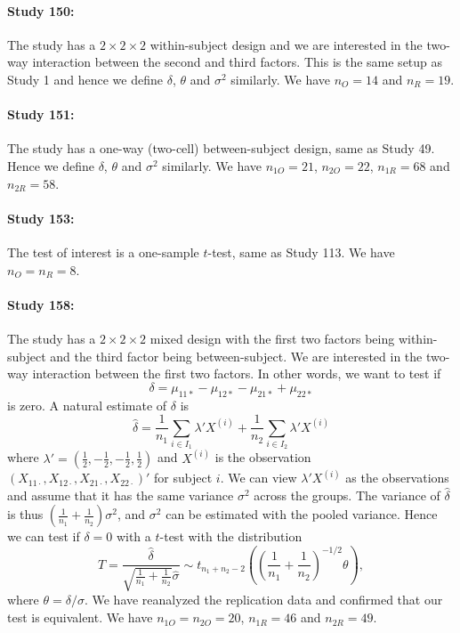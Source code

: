 \documentclass[11pt]{article}
\theoremstyle{definition}
\theoremstyle{custom}
\newcommand{\hdelta}{\hat{\delta}}
\newcommand{\hsigma}{\hat{\sigma}}
\begin{document}
  \paragraph{Study 150: \citet{Forti:2008bq}}
  The study has a $2 \times 2 \times 2$ within-subject design and we are interested in the two-way interaction between the second and third factors. This is the same setup as Study 1 and hence we define $\delta$, $\theta$ and $\sigma^2$ similarly. We have $n_O = 14$ and $n_R = 19$.

  \paragraph{Study 151: \citet{Schnall:2008jz}}
  The study has a one-way (two-cell) between-subject design, same as Study 49. Hence we define $\delta$, $\theta$ and $\sigma^2$ similarly. We have $n_{1O} = 21$, $n_{2O} = 22$, $n_{1R} = 68$ and $n_{2R} = 58$.

  \paragraph{Study 153: \citet{Palmer:2008gb}}
  The test of interest is a one-sample $t$-test, same as Study 113. We have $n_O = n_R = 8$.

  \paragraph{Study 158: \citet{Goschke:2008ey}}
  The study has a $2 \times 2 \times 2$ mixed design with the first two factors being within-subject and the third factor being between-subject. We are interested in the two-way interaction between the first two factors. In other words, we want to test if
  \[
  \delta = \mu_{11*} - \mu_{12*} - \mu_{21*} + \mu_{22*}
  \]
  is zero. A natural estimate of $\delta$ is
  \[
  \hdelta = \frac{1}{n_1} \sum_{i \in I_1} \lambda' X^{(i)} + \frac{1}{n_2} \sum_{i \in I_2} \lambda' X^{(i)}
  \]
  where $\lambda' = (\frac{1}{2}, -\frac{1}{2}, -\frac{1}{2}, \frac{1}{2})$ and $X^{(i)}$ is the observation $(X_{11\cdot}, X_{12\cdot}, X_{21\cdot}, X_{22\cdot})'$ for subject $i$. We can view $\lambda' X^{(i)}$ as the observations and assume that it has the same variance $\sigma^2$ across the groups. The variance of $\hdelta$ is thus $(\frac{1}{n_1} + \frac{1}{n_2}) \sigma^2$, and $\sigma^2$ can be estimated with the pooled variance. Hence we can test if $\delta = 0$ with a $t$-test with the distribution
  \[
  T = \frac{\hdelta}{\sqrt{\frac{1}{n_1} + \frac{1}{n_2}} \hsigma} \sim t_{n_1 + n_2 - 2} \left(\left(\frac{1}{n_1} + \frac{1}{n_2}\right)^{-1/2} \theta\right),
  \]
  where $\theta = \delta / \sigma$. We have reanalyzed the replication data and confirmed that our test is equivalent. We have $n_{1O} = n_{2O} = 20$, $n_{1R} = 46$ and $n_{2R} = 49$.
\end{document}
